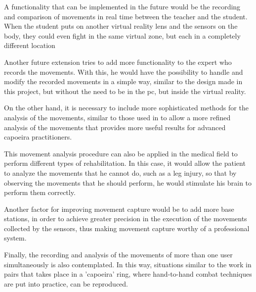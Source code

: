 A functionality that can be implemented in the future would be the recording and comparison of movements in real time between the teacher and the student. When the student puts on another virtual reality lens and the sensors on the body, they could even fight in the same virtual zone, but each in a completely different location

Another future extension tries to add more functionality to the expert who records the movements. With this, he would have the possibility to handle and modify the recorded movements in a simple way, similar to the design made in this project, but without the need to be in the pc, but inside the virtual reality.

On the other hand, it is necessary to include more sophisticated methods for the analysis of the movements, similar to those used in \cite{Keerthy:Thesis:2012,Kyan:2015:ABD:2753829.2735951} to allow a more refined analysis of the movements that provides more useful results for advanced capoeira practitioners.

This movement analysis procedure can also be applied in the medical field to perform different types of rehabilitation. In this case, it would allow the patient to analyze the movements that he cannot do, such as a leg injury, so that by observing the movements that he should perform, he would stimulate his brain to perform them correctly.

Another factor for improving movement capture would be to add more base stations, in order to achieve greater precision in the execution of the movements collected by the sensors, thus making movement capture worthy of a professional system.

Finally, the recording and analysis of the movements of more than one user simultaneously is also contemplated. In this way, situations similar to the work in pairs that takes place in a 'capoeira' ring, where hand-to-hand combat techniques are put into practice, can be reproduced.

